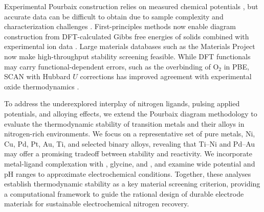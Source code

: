 \documentclass[journal=jacsat,manuscript=article]{achemso}
\begin{document}
Experimental Pourbaix construction relies on measured chemical potentials \cite{PourbaixAtlasSolutions, Pourbaix1973LecturesCorrosion, Beverskog1999PourbaixIron-Chromium-Nickel}, but accurate data can be difficult to obtain due to sample complexity and characterization challenges \cite{Huang2017ImprovedCompounds}. First-principles methods now enable diagram construction from DFT-calculated Gibbs free energies of solids combined with experimental ion data \cite{Wang2020PredictingFunctional, Lopez2023ComputationalStudies, Liu2024ReversiblePH, Ding2018ElectrochemicalStates, Huang2015ElectrochemicalCalculations, Persson2012PredictionStates, Patel2019EfficientCompounds, Oses2018AFLOW-CHULL:Analysis}. Large materials databases such as the Materials Project \cite{Ong2013PythonAnalysis, Singh2017ElectrochemicalMaterials, Jain2011FormationCalculations, Montoya2015TheoreticalSplitting, Singh2019RobustDiscovery} now make high-throughput stability screening feasible. While DFT functionals may carry functional-dependent errors, such as the overbinding of O$_2$ in PBE, SCAN with Hubbard $U$ corrections has improved agreement with experimental oxide thermodynamics \cite{Wang2020PredictingFunctional}.


To address the underexplored interplay of nitrogen ligands, pulsing applied potentials, and alloying effects, we extend the Pourbaix diagram methodology to evaluate the thermodynamic stability of transition metals and their alloys in nitrogen-rich environments. We focus on a representative set of pure metals, Ni, Cu, Pd, Pt, Au, Ti, and selected binary alloys, revealing that Ti–Ni and Pd–Au may offer a promising tradeoff between stability and reactivity. We incorporate metal-ligand complexation with , glycine, and , and examine wide potential and pH ranges to approximate electrochemical conditions. Together, these analyses establish thermodynamic stability as a key material screening criterion, providing a computational framework to guide the rational design of durable electrode materials for sustainable electrochemical nitrogen recovery.
\end{document}
